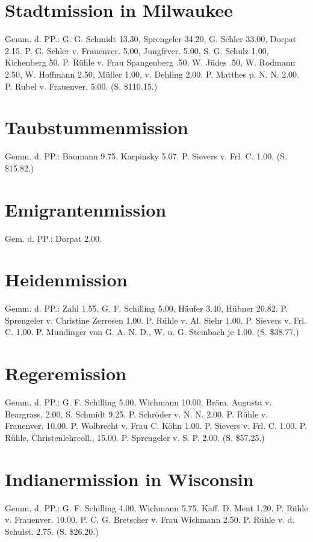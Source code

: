 \section{Stadtmission in Milwaukee}

Gemm. d. PP.: G. G. Schmidt 13.30, Sprengeler 34.20, G. Schler 33.00, Dorpat 2.15. P. G. Schler v. Frauenver. 5.00, Jungfrver. 5.00, S. G. Schulz 1.00, Kichenberg 50. P. Rühle v. Frau Spangenberg .50, W. Jüdes .50, W. Rodmann 2.50, W. Hoffmann 2.50, Müller 1.00, v. Dehling 2.00. P. Matthes p. N. N. 2.00. P. Rubel v. Frauenver. 5.00. (S. \$110.15.)

\section{Taubstummenmission}

Gemm. d. PP.: Baumann 9.75, Karpinsky 5.07. P. Sievers v. Frl. C. 1.00. (S. \$15.82.)

\section{Emigrantenmission}

Gem. d. PP.: Dorpat 2.00.

\section{Heidenmission}

Gemm. d. PP.: Zahl 1.55, G. F. Schilling 5.00, Häufer 3.40, Hübner 20.82. P. Sprengeler v. Christine Zerresen 1.00. P. Rühle v. Al. Siehr 1.00. P. Sievers v. Frl. C. 1.00. P. Mundinger von G. A. N. D., W. u. G. Steinbach je 1.00. (S. \$38.77.)

\section{Regeremission}

Gemm. d. PP.: G. F. Schilling 5.00, Wichmann 10.00, Bräm, Augusta v. Beargrass, 2.00, S. Schmidt 9.25. P. Schröder v. N. N. 2.00. P. Rühle v. Frauenver. 10.00. P. Wolbrecht v. Frau C. Köhn 1.00. P. Sievers v. Frl. C. 1.00. P. Rühle, Christenlehrcoll., 15.00. P. Sprengeler v. S. P. 2.00. (S. \$57.25.)

\section{Indianermission in Wisconsin}

Gemm. d. PP.: G. F. Schilling 4.00, Wichmann 5.75. Kaff. D. Ment 1.20. P. Rühle v. Frauenver. 10.00. P. C. G. Bretscher v. Frau Wichmann 2.50. P. Rühle v. d. Schulst. 2.75. (S. \$26.20.)

